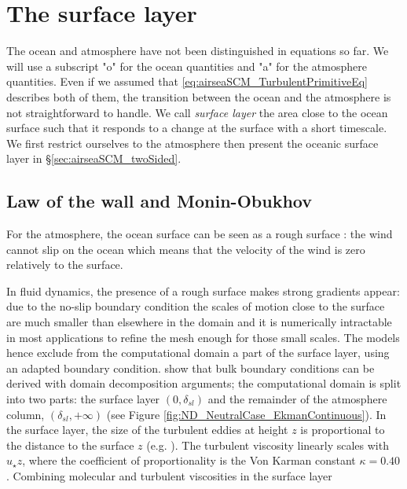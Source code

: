 \section{The surface layer}
\label{sec:airseaSCM_SL}
The ocean and atmosphere have not been distinguished in equations so far.
We will use a subscript "o" for the ocean quantities and "a" for the
atmosphere quantities.
Even if we assumed that \eqref{eq:airseaSCM_TurbulentPrimitiveEq}
describes both of them, the transition between the ocean and the
atmosphere is not straightforward to handle.
We call \textit{surface layer} the area close to the ocean surface
such that it responds to a change at the surface with a short
timescale.
We first restrict ourselves to the atmosphere then
present the oceanic surface layer in \S \ref{sec:airseaSCM_twoSided}.
\subsection{Law of the wall and Monin-Obukhov}
For the atmosphere, the ocean surface can be seen as a
rough surface : the wind cannot slip on the ocean which
means that the velocity of the wind is zero
relatively to the surface.
\par
{}
\par
In fluid dynamics, the presence of a rough surface makes strong
gradients appear:
due to the no-slip boundary condition
the scales of motion close to the surface are much smaller than
elsewhere in the domain and it is numerically
intractable in most applications
to refine the mesh enough for those small scales.
The models hence exclude from the computational domain
a part of the surface layer, using an adapted boundary
condition.
\cite{mohammadi_rough_1998} show that bulk boundary
conditions can be derived with domain decomposition arguments;
the computational domain is split into two parts:
the surface layer $(0,\delta_{sl})$ and the remainder of
the atmosphere column, $(\delta_{sl}, +\infty)$
(see Figure \ref{fig:ND_NeutralCase_EkmanContinuous}).
%
 In the surface layer, the size of the turbulent eddies at height $z$
 is proportional to the distance to the surface $z$
 (e.g. \cite{kawai_wall-modeling_2012}).
The turbulent viscosity
linearly scales with $u_\star z$, where the coefficient of
proportionality is the Von Karman constant $\kappa = 0.40$.
Combining molecular and turbulent viscosities in the surface layer
\par
